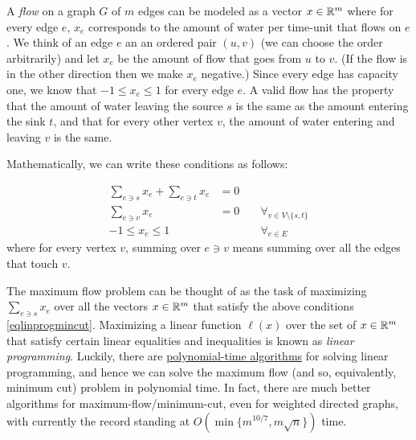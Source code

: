 A \emph{flow} on a graph \(G\) of \(m\) edges can be modeled as a vector
\(x\in {\mathbb{R}}^m\) where for every edge \(e\), \(x_e\) corresponds to the
amount of water per time-unit that flows on \(e\). We think of an edge
\(e\) an an ordered pair \((u,v)\) (we can choose the order arbitrarily)
and let \(x_e\) be the amount of flow that goes from \(u\) to \(v\). (If
the flow is in the other direction then we make \(x_e\) negative.) Since
every edge has capacity one, we know that \(-1 \leq x_e \leq 1\) for
every edge \(e\). A valid flow has the property that the amount of water
leaving the source \(s\) is the same as the amount entering the sink
\(t\), and that for every other vertex \(v\), the amount of water
entering and leaving \(v\) is the same.

Mathematically, we can write these conditions as follows:

\[
\begin{aligned}
\sum_{e \ni s} x_e  + \sum_{e\ni t} x_e &=0  && \\
\sum_{e\ni v} x_e &=0 \; &&\forall_{v \in V \setminus \{s,t\}} \\
-1 \leq x_e \leq 1 &  \; &&\forall_{e\in E}
\end{aligned}
\label{eqlinprogmincut}
\] where for every vertex \(v\), summing over \(e \ni v\) means summing
over all the edges that touch \(v\).

The maximum flow problem can be thought of as the task of maximizing
\(\sum_{e \ni s} x_e\) over all the vectors \(x\in{\mathbb{R}}^m\) that satisfy
the above conditions \eqref{eqlinprogmincut}. Maximizing a linear
function \(\ell(x)\) over the set of \(x\in {\mathbb{R}}^m\) that satisfy certain
linear equalities and inequalities is known as \emph{linear
programming}. Luckily, there are
\href{https://en.wikipedia.org/wiki/Linear_programming\#Algorithms}{polynomial-time
algorithms} for solving linear programming, and hence we can solve the
maximum flow (and so, equivalently, minimum cut) problem in polynomial
time. In fact, there are much better algorithms for
maximum-flow/minimum-cut, even for weighted directed graphs, with
currently the record standing at \(O(\min\{ m^{10/7}, m\sqrt{n}\})\)
time.

\hypertarget{globalmincut}{}

